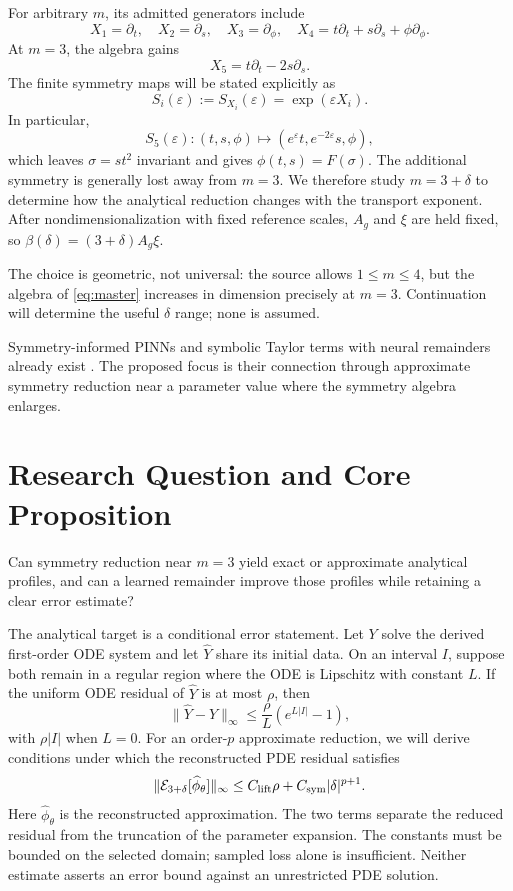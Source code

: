 \documentclass[12pt]{article}
\newcommand{\E}{\mathcal E}
\newcommand{\eps}{\varepsilon}
\begin{document}
For arbitrary $m$, its admitted generators include
\[
X_1=\partial_t,\quad X_2=\partial_s,\quad X_3=\partial_\phi,\quad
X_4=t\partial_t+s\partial_s+\phi\partial_\phi.
\]
At $m=3$, the algebra gains
\[
X_5=t\partial_t-2s\partial_s.
\]
The finite symmetry maps will be stated explicitly as
\[
S_i(\eps):=S_{X_i}(\eps)=\exp(\eps X_i).
\]
In particular,
\[
S_5(\eps):(t,s,\phi)\mapsto(e^\eps t,e^{-2\eps}s,\phi),
\]
which leaves $\sigma=st^2$ invariant and gives $\phi(t,s)=F(\sigma)$. The additional symmetry is generally lost away from $m=3$. We therefore study $m=3+\delta$ to determine how the analytical reduction changes with the transport exponent.
After nondimensionalization with fixed reference scales, $A_g$ and $\xi$ are held fixed, so $\beta(\delta)=(3+\delta)A_g\xi$.

The choice is geometric, not universal: the source allows $1\le m\le4$, but
the algebra of \eqref{eq:master} increases in dimension precisely at $m=3$.
Continuation will determine the useful $\delta$ range; none is assumed.

Symmetry-informed PINNs and symbolic Taylor terms with neural remainders already exist \cite{liepinn,taylor}. The proposed focus is their connection through approximate symmetry reduction near a parameter value where the symmetry algebra enlarges.

\section{Research Question and Core Proposition}

Can symmetry reduction near $m=3$ yield exact or approximate analytical profiles, and can a learned remainder improve those profiles while retaining a clear error estimate?

The analytical target is a conditional error statement. Let $Y$ solve the derived first-order ODE system and let $\widehat Y$ share its initial data. On an interval $I$, suppose both remain in a regular region where the ODE is Lipschitz with constant $L$. If the uniform ODE residual of $\widehat Y$ is at most $\rho$, then
\begin{equation}
\|\widehat Y-Y\|_{\infty}
\le \frac{\rho}{L}\left(e^{L|I|}-1\right),
\label{eq:profile-bound}
\end{equation}
with $\rho|I|$ when $L=0$. For an order-$p$ approximate reduction, we will derive conditions under which the reconstructed PDE residual satisfies
\begin{equation}
\|\E_{3+\delta}[\widehat\phi_\theta]\|_\infty
\le C_{\rm lift}\rho+C_{\rm sym}|\delta|^{p+1}.
\label{eq:lift-bound}
\end{equation}
Here $\widehat\phi_\theta$ is the reconstructed approximation. The two terms separate the reduced residual from the truncation of the parameter expansion. The constants must be bounded on the selected domain; sampled loss alone is insufficient. Neither estimate asserts an error bound against an unrestricted PDE solution.
\end{document}
